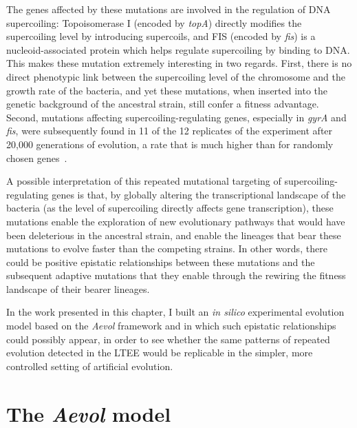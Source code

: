 The genes affected by these mutations are involved in the regulation of DNA supercoiling: Topoisomerase I (encoded by \emph{topA}) directly modifies the supercoiling level by introducing supercoils, and FIS (encoded by \emph{fis}) is a nucleoid-associated protein which helps regulate supercoiling by binding to DNA.
This makes these mutation extremely interesting in two regards.
First, there is no direct phenotypic link between the supercoiling level of the chromosome and the growth rate of the bacteria, and yet these mutations, when inserted into the genetic background of the ancestral strain, still confer a fitness advantage.
Second, mutations affecting supercoiling-regulating genes, especially in \emph{gyrA} and \emph{fis}, were subsequently found in 11 of the 12 replicates of the experiment after 20,000 generations of evolution, a rate that is much higher than for randomly chosen genes~\citep{crozat2010}.

A possible interpretation of this repeated mutational targeting of supercoiling-regulating genes is that, by globally altering the transcriptional landscape of the bacteria (as the level of supercoiling directly affects gene transcription), these mutations enable the exploration of new evolutionary pathways that would have been deleterious in the ancestral strain, and enable the lineages that bear these mutations to evolve faster than the competing strains.
In other words, there could be positive epistatic relationships between these mutations and the subsequent adaptive mutations that they enable through the rewiring the fitness landscape of their bearer lineages.

In the work presented in this chapter, I built an \emph{in silico} experimental evolution model based on the \emph{Aevol} framework and in which such epistatic relationships could possibly appear, in order to see whether the same patterns of repeated evolution detected in the LTEE would be replicable in the simpler, more controlled setting of artificial evolution.

\section{The \emph{Aevol} model}
\label{sec:aevol:model}

